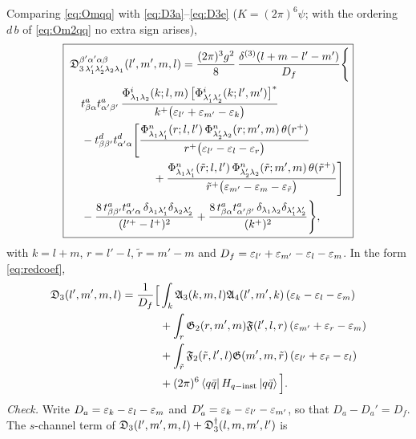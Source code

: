 Comparing \eqref{eq:Omqq} with \eqref{eq:D3a}--\eqref{eq:D3e} ($K=(2\pi)^{6}\psi$; with the ordering
$d\,b$ of \eqref{eq:Om2qq} no extra sign arises),
{\small
\begin{equation}
\boxed{\;
\begin{aligned}
&\mathfrak{D}^{\beta'\alpha'\alpha\beta}_{3\,\lambda_{1}'\lambda_{2}'\lambda_{2}\lambda_{1}}(l',m',m,l)
=\frac{(2\pi)^{3}g^{2}}{8}\,\frac{\delta^{(3)}(l+m-l'-m')}{D_{f}}\Bigg\{
\\&\quad
t^{a}_{\beta\alpha}t^{a}_{\alpha'\beta'}\,
\frac{\Phi^{i}_{\lambda_{1}\lambda_{2}}(k;l,m)\,\big[\Phi^{i}_{\lambda_{1}'\lambda_{2}'}(k;l',m')\big]^{*}}
{k^{+}\big(\varepsilon_{l'}+\varepsilon_{m'}-\varepsilon_{k}\big)}
\\
&\quad-t^{d}_{\beta\beta'}t^{d}_{\alpha'\alpha}\Bigg[
\frac{\Phi^{n}_{\lambda_{1}\lambda_{1}'}(r;l,l')\,\Phi^{n}_{\lambda_{2}'\lambda_{2}}(r;m',m)\,\theta(r^{+})}
{r^{+}\big(\varepsilon_{l'}-\varepsilon_{l}-\varepsilon_{r}\big)}
\\&\hspace{2.6cm}+\frac{\Phi^{n}_{\lambda_{1}\lambda_{1}'}(\tilde r;l,l')\,\Phi^{n}_{\lambda_{2}'\lambda_{2}}(\tilde r;m',m)\,\theta(\tilde r^{+})}
{\tilde r^{+}\big(\varepsilon_{m'}-\varepsilon_{m}-\varepsilon_{\tilde r}\big)}\Bigg]
\\
&\quad-\frac{8\,t^{a}_{\beta\beta'}t^{a}_{\alpha'\alpha}\,\delta_{\lambda_{1}\lambda_{1}'}\delta_{\lambda_{2}\lambda_{2}'}}{(l'^{+}-l^{+})^{2}}
+\frac{8\,t^{a}_{\beta\alpha}t^{a}_{\alpha'\beta'}\,\delta_{\lambda_{1}\lambda_{2}}\delta_{\lambda_{1}'\lambda_{2}'}}{(k^{+})^{2}}\Bigg\},
\end{aligned}}
\label{eq:D3}
\end{equation}}
with $k=l+m$, $r=l'-l$, $\tilde r=m'-m$ and $D_{f}=\varepsilon_{l'}+\varepsilon_{m'}-\varepsilon_{l}-\varepsilon_{m}$. In the form
\eqref{eq:redcoef},
\begin{align}
\mathfrak{D}_{3}(l',m',m,l)=\frac{1}{D_{f}}\Big[&\int_{k}\mathfrak{A}_{3}(k,m,l)\mathfrak{A}_{4}(l',m',k)\,(\varepsilon_{k}-\varepsilon_{l}-\varepsilon_{m})
\nonumber\\&+\int_{r}\mathfrak{G}_{2}(r,m',m)\mathfrak{F}(l',l,r)\,(\varepsilon_{m'}+\varepsilon_{r}-\varepsilon_{m})
\nonumber\\
&+\int_{\tilde r}\mathfrak{F}_{2}(\tilde r,l',l)\mathfrak{G}(m',m,\tilde r)\,(\varepsilon_{l'}+\varepsilon_{\tilde r}-\varepsilon_{l})
\nonumber\\&+(2\pi)^{6}\left\langle q\bar q\right|H_{q-{\rm inst}}\left|q\bar q\right\rangle\Big].
\label{eq:D3red}
\end{align}
\emph{Check.} Write $D_{a}=\varepsilon_{k}-\varepsilon_{l}-\varepsilon_{m}$ and $D_{a}'=\varepsilon_{k}-\varepsilon_{l'}-\varepsilon_{m'}$, so that
$D_{a}-D_{a}'=D_{f}$. The $s$-channel term of $\mathfrak{D}_{3}(l',m',m,l)+\mathfrak{D}_{3}^{\dagger}(l,m,m',l')$ is
